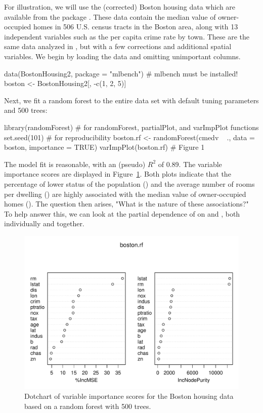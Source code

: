 For illustration, we will use the (corrected) Boston housing data which are available from the  package \citep{mlbench-pkg}. These data contain the median value of owner-occupied homes in 506 U.S. census tracts in the Boston area, along with 13 independent variables such as the per capita crime rate by town. These are the same data analyzed in \citet{harrison-1978-hedonic}, but with a few corrections and additional spatial variables. We begin by loading the data and omitting unimportant columns.
\begin{example}
data(BostonHousing2, package = "mlbench")  # mlbench must be installed!
boston <- BostonHousing2[, -c(1, 2, 5)]
\end{example}
Next, we fit a random forest to the entire data set with default tuning parameters and 500 trees:
\begin{example}
library(randomForest)  # for randomForest, partialPlot, and varImpPlot functions
set.seed(101)  # for reproducibility
boston.rf <- randomForest(cmedv ~ ., data = boston, importance = TRUE)
varImpPlot(boston.rf)  # Figure 1
\end{example}
The model fit is reasonable, with an  (pseudo) $R^2$ of 0.89. The variable importance scores are displayed in Figure~\ref{fig:plotmo_vs_partial}. Both plots indicate that the percentage of lower status of the population () and the average number of rooms per dwelling () are highly associated with the median value of owner-occupied homes (). The question then arises, "What is the nature of these associations?" To help answer this, we can look at the partial dependence of  on  and , both individually and together.

\begin{figure}[!htbp]
  \centering
  \includegraphics[width=1.0\linewidth]{boston_rf_vimp}
  \caption{Dotchart of variable importance scores for the Boston housing data based on a random forest with 500 trees.}
  \label{fig:plotmo_vs_partial}
\end{figure}


